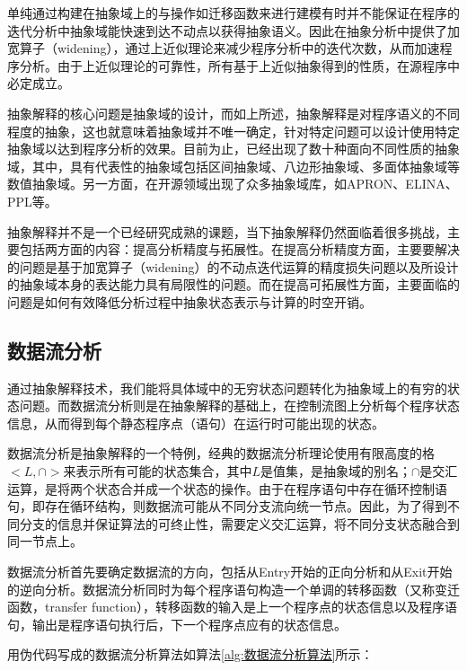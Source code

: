  单纯通过构建在抽象域上的与操作如迁移函数来进行建模有时并不能保证在程序的迭代分析中抽象域能快速到达不动点以获得抽象语义。因此在抽象分析中提供了加宽算子（widening），通过上近似理论来减少程序分析中的迭代次数，从而加速程序分析。由于上近似理论的可靠性，所有基于上近似抽象得到的性质，在源程序中必定成立。
 
 抽象解释的核心问题是抽象域的设计，而如上所述，抽象解释是对程序语义的不同程度的抽象，这也就意味着抽象域并不唯一确定，针对特定问题可以设计使用特定抽象域以达到程序分析的效果。目前为止，已经出现了数十种面向不同性质的抽象域，其中，具有代表性的抽象域包括区间抽象域、八边形抽象域、多面体抽象域等数值抽象域\cite{张健2019程序分析研究进展}。另一方面，在开源领域出现了众多抽象域库，如APRON\cite{jeannet2009apron}、ELINA\cite{singh2017practical}、PPL\cite{bagnara2006parma}等。
 
 抽象解释并不是一个已经研究成熟的课题，当下抽象解释仍然面临着很多挑战，主要包括两方面的内容：提高分析精度与拓展性。在提高分析精度方面，主要要解决的问题是基于加宽算子（widening）的不动点迭代运算的精度损失问题以及所设计的抽象域本身的表达能力具有局限性的问题。而在提高可拓展性方面，主要面临的问题是如何有效降低分析过程中抽象状态表示与计算的时空开销。
 
 \subsection{数据流分析}
 
 通过抽象解释技术，我们能将具体域中的无穷状态问题转化为抽象域上的有穷的状态问题。而数据流分析则是在抽象解释的基础上，在控制流图上分析每个程序状态信息，从而得到每个静态程序点（语句）在运行时可能出现的状态。
 
 数据流分析是抽象解释的一个特例，经典的数据流分析理论\cite{aho1986compilers}使用有限高度的格$ <L,∩> $来表示所有可能的状态集合，其中$ L $是值集，是抽象域的别名；$ ∩ $是交汇运算，是将两个状态合并成一个状态的操作。由于在程序语句中存在循环控制语句，即存在循环结构，则数据流可能从不同分支流向统一节点。因此，为了得到不同分支的信息并保证算法的可终止性，需要定义交汇运算，将不同分支状态融合到同一节点上。
 
 数据流分析首先要确定数据流的方向，包括从Entry开始的正向分析和从Exit开始的逆向分析。数据流分析同时为每个程序语句构造一个单调的转移函数（又称变迁函数，transfer function），转移函数的输入是上一个程序点的状态信息以及程序语句，输出是程序语句执行后，下一个程序点应有的状态信息。
 
 用伪代码写成的数据流分析算法\cite{cooper2004iterative}如算法\ref{alg:数据流分析算法}所示：
 
